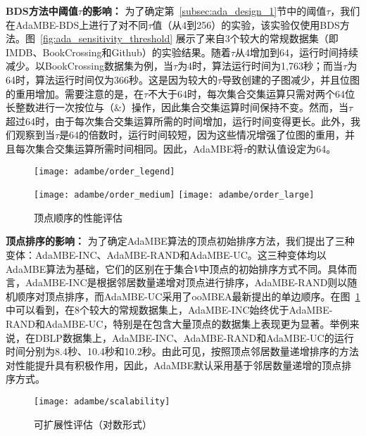 \textbf{BDS方法中阈值$\tau$的影响：} 为了确定第~\ref{subsec:ada_design_1}节中的阈值$\tau$，我们在AdaMBE-BDS上进行了对不同$\tau$值（从4到256）的实验，该实验仅使用BDS方法。图~\ref{fig:ada_sensitivity_threshold} 展示了来自3个较大的常规数据集（即IMDB、BookCrossing和Github）的实验结果。随着$\tau$从4增加到64，运行时间持续减少。以BookCrossing数据集为例，当$\tau$为4时，算法运行时间为1,763秒；而当$\tau$为64时，算法运行时间仅为366秒。这是因为较大的$\tau$导致创建的子图减少，并且位图的重用增加。需要注意的是，在$\tau$不大于64时，每次集合交集运算只需对两个64位长整数进行一次按位与（\&）操作，因此集合交集运算时间保持不变。然而，当$\tau$超过64时，由于每次集合交集运算所需的时间增加，运行时间变得更长。此外，我们观察到当$\tau$是64的倍数时，运行时间较短，因为这些情况增强了位图的重用，并且每次集合交集运算所需时间相同。因此，AdaMBE将$\tau$的默认值设定为64。




\begin{figure} [H]
	\centering
	
  \texttt{[image: adambe/order\_legend]}
  

		\texttt{[image: adambe/order\_medium]}
  \quad
		\texttt{[image: adambe/order\_large]}

	\caption{顶点顺序的性能评估}
	\label{fig:ada_order}

\end{figure}

\textbf{顶点排序的影响：} 为了确定AdaMBE算法的顶点初始排序方法，我们提出了三种变体：AdaMBE-INC、AdaMBE-RAND和AdaMBE-UC。这三种变体均以AdaMBE算法为基础，它们的区别在于集合$V$中顶点的初始排序方式不同。具体而言，AdaMBE-INC是根据邻居数量递增对顶点进行排序，AdaMBE-RAND则以随机顺序对顶点排序，而AdaMBE-UC采用了ooMBEA最新提出的单边顺序。在图~\ref{fig:ada_order} 中可以看到，在8个较大的常规数据集上，AdaMBE-INC始终优于AdaMBE-RAND和AdaMBE-UC，特别是在包含大量顶点的数据集上表现更为显著。举例来说，在DBLP数据集上，AdaMBE-INC、AdaMBE-RAND和AdaMBE-UC的运行时间分别为8.4秒、10.4秒和10.2秒。由此可见，按照顶点邻居数量递增排序的方法对性能提升具有积极作用，因此，AdaMBE默认采用基于邻居数量递增的顶点排序方式。

\begin{figure} [t]
	\centering
		\vspace{0.1in}
		\texttt{[image: adambe/scalability]}
	\caption{可扩展性评估（对数形式）}
	\label{fig:ada_scalability}
\end{figure}



